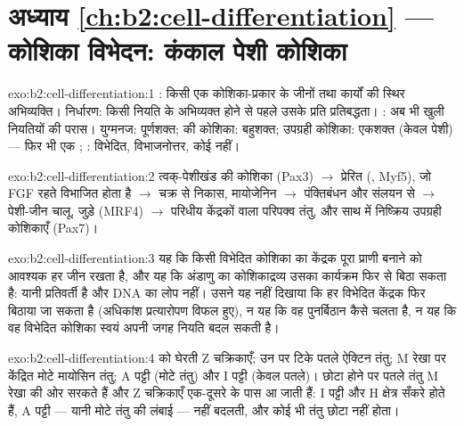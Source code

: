 \section*{अध्याय \ref{ch:b2:cell-differentiation} --- कोशिका विभेदन: कंकाल पेशी कोशिका}

\begin{solution}{exo:b2:cell-differentiation:1}
: किसी एक कोशिका-प्रकार के जीनों तथा कार्यों की स्थिर
अभिव्यक्ति। निर्धारण: किसी नियति के अभिव्यक्त होने से पहले उसके प्रति
प्रतिबद्धता। : अब भी खुली नियतियों की परास। युग्मनज:
पूर्णशक्त;  की कोशिका: बहुशक्त; उपग्रही कोशिका:
एकशक्त (केवल पेशी) --- फिर भी एक ; :
विभेदित, विभाजनोत्तर, कोई  नहीं।
\end{solution}

\begin{solution}{exo:b2:cell-differentiation:2}
त्वक्-पेशीखंड की कोशिका (Pax3) $\to$ प्रेरित  (, Myf5),
जो FGF रहते विभाजित होता है $\to$ चक्र से निकास, मायोजेनिन $\to$ पंक्तिबंधन
और संलयन से  $\to$ पेशी-जीन चालू, 
जुड़े (MRF4) $\to$ परिधीय केंद्रकों वाला परिपक्व तंतु, और साथ में
निष्क्रिय उपग्रही कोशिकाएँ (Pax7)।
\end{solution}

\begin{solution}{exo:b2:cell-differentiation:3}
यह कि किसी विभेदित कोशिका का केंद्रक पूरा प्राणी बनाने को आवश्यक हर जीन
रखता है, और यह कि अंडाणु का कोशिकाद्रव्य उसका कार्यक्रम फिर से बिठा
सकता है: यानी  प्रतिवर्ती है और DNA का लोप नहीं। उसने यह
नहीं दिखाया कि हर विभेदित केंद्रक फिर बिठाया जा सकता है (अधिकांश
प्रत्यारोपण विफल हुए), न यह कि वह पुनर्बिठान कैसे चलता है, न यह कि वह
विभेदित कोशिका स्वयं अपनी जगह नियति बदल सकती है।
\end{solution}

\begin{solution}{exo:b2:cell-differentiation:4}
 को घेरती Z चक्रिकाएँ; उन पर टिके पतले ऐक्टिन तंतु;
M रेखा पर केंद्रित मोटे मायोसिन तंतु; A पट्टी
(मोटे तंतु) और I पट्टी (केवल पतले)। छोटा होने पर पतले
तंतु M रेखा की ओर सरकते हैं और Z चक्रिकाएँ एक-दूसरे के पास आ जाती हैं:
I पट्टी और H क्षेत्र सँकरे होते हैं, A पट्टी --- यानी मोटे तंतु की
लंबाई --- नहीं बदलती, और कोई भी तंतु छोटा नहीं होता।
\end{solution}

